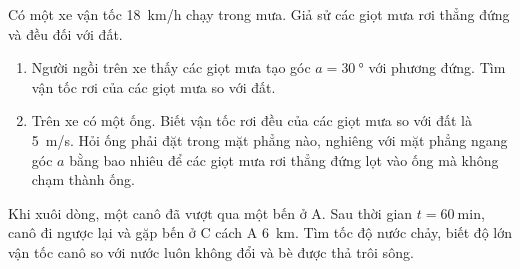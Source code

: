 \begin{ex}
	Có một xe vận tốc \SI{18}{\kilo\meter/\hour} chạy trong mưa. Giả sử các giọt mưa rơi thẳng đứng và đều đối với đất.
	\begin{enumerate}[label=\alph*)]
		\item Người ngồi trên xe thấy các giọt mưa tạo góc $a = \SI{30}{\degree}$ với phương đứng. Tìm vận tốc rơi của các giọt mưa so với đất.
		\item Trên xe có một ống. Biết vận tốc rơi đều của các giọt mưa so với đất là \SI{5}{\meter/\second}. Hỏi ống phải đặt trong mặt phẳng nào, nghiêng với mặt phẳng ngang góc $a$ bằng bao nhiêu để các giọt mưa rơi thẳng đứng lọt vào ống mà không chạm thành ống.
	\end{enumerate}
\end{ex}

\begin{ex}
	Khi xuôi dòng, một canô đã vượt qua một bến ở A. Sau thời gian $t = \SI{60}{\minute}$, canô đi ngược lại và gặp bến ở C cách A \SI{6}{\kilo\meter}. Tìm tốc độ nước chảy, biết độ lớn vận tốc canô so với nước luôn không đổi và bè được thả trôi sông.
\end{ex}



